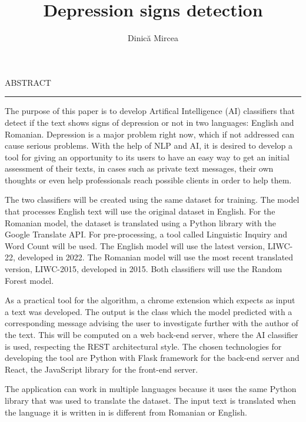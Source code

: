 \documentclass[12pt]{report}
\begin{document}
\title{Depression signs detection}					   
\author{Dinică Mircea}											
				
\maketitle


\newpage
\thispagestyle{empty}
\mbox{}
\newpage
{} 

\cleardoublepage
ABSTRACT
\vspace{0.5cm}	
\hrule
\vspace{0.5cm}	

The purpose of this paper is to develop Artifical Intelligence (AI) classifiers that detect if the text shows signs of depression or not in two languages: English and Romanian. Depression is a major problem right now, which if not addressed can cause serious problems. With the help of NLP and AI, it is desired to develop a tool for giving an opportunity to its users to have an easy way to get an initial assessment of their texts, in cases such as private text messages, their own thoughts or even help professionals reach possible clients in order to help them. 

The two classifiers will be created using the same dataset for training. The model that processes English text will use the original dataset in English. For the Romanian model, the dataset is translated using a Python library with the Google Translate API. For pre-processing, a tool called Linguistic Inquiry and Word Count will be used. The English model will use the latest version, LIWC-22, developed in 2022. The Romanian model will use the most recent translated version, LIWC-2015, developed in 2015. Both classifiers will use the Random Forest model.

As a practical tool for the algorithm, a chrome extension which expects as input a text was developed. The output is the class which the model predicted with a corresponding message advising the user to investigate further with the author of the text. This will be computed on a web back-end server, where the AI classifier is used, respecting the REST architectural style. The chosen technologies for developing the tool are Python with Flask framework for the back-end server and React, the JavaScript library for the front-end server.

The application can work in multiple languages because it uses the same Python library that was used to translate the dataset. The input text is translated when the language it is written in is different from Romanian or English.  
\end{document}
